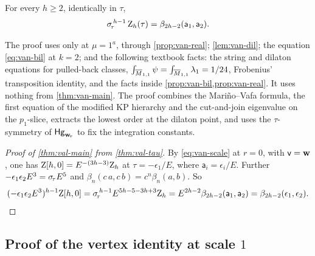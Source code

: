 \begin{thm}\label{thm:val-tau}
For every $h\geq 2$, identically in $\tau$,
\[
\sigma_{\!\tau}^{\,h-1}\,\mathrm{Z}_h(\tau)=\beta_{2h-2}(\mathsf{a}_1,\mathsf{a}_2).
\]
\end{thm}

The proof uses \cite[eq.~(1)--(3)]{LLZ03} only at $\mu=1^a$, through \cref{prop:van-real}; \cref{lem:van-dil}; the equation \eqref{eq:van-bil} at $k=2$; and the following textbook facts: the string and dilaton equations for pulled-back classes, $\int_{\overline{M}_{1,1}}\psi=\int_{\overline{M}_{1,1}}\lambda_1=1/24$, Frobenius' transposition identity, and the facts inside \cref{prop:van-bil,prop:van-real}. It uses nothing from \cref{thm:van-main}. The proof combines the Mari\~no--Vafa formula, the first equation of the modified KP hierarchy and the cut-and-join eigenvalue on the $p_1$-slice, extracts the lowest order at the dilaton point, and uses the $\tau$-symmetry of $\mathsf{Hg}_{\mathbf{w}_{\!\tau}}$ to fix the integration constants.

\begin{proof}[Proof of \cref{thm:val-main} from \cref{thm:val-tau}]
By \eqref{eq:van-scale} at $r=0$, with $\mathsf{v}=\mathbf{w}$, one has $\mathrm{Z}[h,0]=E^{-(3h-3)}\mathrm{Z}_h$ at $\tau=-\epsilon_1/E$, where $\mathsf{a}_i=\epsilon_i/E$. Further $-\epsilon_1\epsilon_2E^3=\sigma_{\!\tau} E^5$ and $\beta_n(c\,a,c\,b)=c^n\beta_n(a,b)$. So
\[
(-\epsilon_1\epsilon_2E^3)^{h-1}\mathrm{Z}[h,0]=\sigma_{\!\tau}^{\,h-1}E^{5h-5-3h+3}\mathrm{Z}_h=E^{2h-2}\beta_{2h-2}(\mathsf{a}_1,\mathsf{a}_2)=\beta_{2h-2}(\epsilon_1,\epsilon_2).\qedhere
\]
\end{proof}

\subsection{Proof of the vertex identity at scale \texorpdfstring{$1$}{1}}
\label{sec:val-proof}

